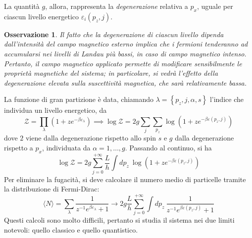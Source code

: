 \documentclass[11pt, a4paper]{scrartcl}
\theoremstyle{style}
\newtheorem{osservazione}{Osservazione}[section]
\theoremstyle{style1}
\numberwithin{equation}{subsection}
\begin{document}
La quantit\`a $g$, allora, rappresenta la \textit{degenerazione} relativa a $p_x$, uguale per ciascun livello energetico $\varepsilon _i(p_z,j)$.
\begin{osservazione}
Il fatto che la degenerazione di ciascun livello dipenda dall'intensit\`a del campo magnetico esterno implica che i fermioni tenderanno ad accumularsi nei livelli di Landau pi\`u bassi, in caso di campo magnetico intenso.
Pertanto, il campo magnetico applicato permette di modificare sensibilmente le propriet\`a magnetiche del sistema; in particolare, si vedr\`a l'effetto della degenerazione elevata sulla suscettivit\`a magnetica, che sar\`a relativamente bassa.
\end{osservazione}
\noindent La funzione di gran partizione \`e data, chiamando $\lambda = \left\{ p_z ,j,\alpha ,s \right\} $ l'indice che individua un livello energetico, da
\[
\mathcal{Z}  = \prod_\lambda \left(1+ z e^{-\beta \varepsilon _\lambda }\right) \implies \log \mathcal{Z} = 2g \sum_{j}^{} \sum_{p_z}^{} \log \left( 1 + ze^{-\beta \varepsilon (p_z,j)}\right) 
\] 
dove $2$ viene dalla degenerazione rispetto allo spin $s$ e $g$ dalla degenerazione rispetto a $p_x$, individuata da $\alpha = 1 ,\ldots, g$.
Passando al continuo, si ha
\[
\log\mathcal{Z}  = 2g \sum_{j=0}^{+\infty} \frac{L}{h}\int dp_z \ \log \left(1 + z e^{-\beta \varepsilon (p_z,j)}\right) 
\] 
Per eliminare la fugacit\`a, si deve calcolare il numero medio di particelle tramite la distribuzione di Fermi-Dirac:
\[
\langle N \rangle= \sum_{\lambda }^{} \frac{1}{z^{-1}e^{\beta \varepsilon _\lambda }+1} \longrightarrow 2g \frac{L}{h}\sum_{j=0}^{+\infty} \int dp_z \ \frac{1}{z^{-1}e^{\beta \varepsilon (p_z,j)}+1}
\] 
Questi calcoli sono molto difficili, pertanto si studia il sistema nei due limiti notevoli: quello classico e quello quantistico.
\vspace{.5cm}
\end{document}
